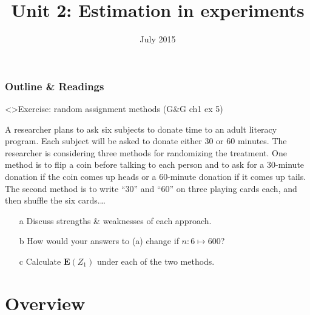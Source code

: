 %

%






\title{Unit 2: Estimation in experiments}
\date{July 2015}




  \begin{frame}
    \frametitle{Outline \& Readings}

\tableofcontents[subsectionstyle=show/hide/hide]

\end{frame}


\begin{frame}<\nottheirhandout>{Exercise: random assignment methods}
{\footnotesize (G\&G ch1 ex 5)}

A researcher plans to ask six subjects to donate time to an adult
literacy program. Each subject will be asked to donate either 30 or 60
minutes. The researcher is considering three methods for randomizing
the treatment. One method is to flip a coin before talking to each
person and to ask for a 30-minute donation if the coin comes up heads
or a 60-minute donation if it comes up tails. The second method is to
write ``30'' and ``60'' on three playing cards each, and then shuffle
the six cards.\ldots
  
\begin{itemize}
\item[a] Discuss strengths \& weaknesses of each approach.
\item[b] How would your answers to (a) change if $n: 6 \mapsto 600$?
\item[c] Calculate $\mathbf{E}(Z_{1})$ under each of the two methods.
\end{itemize}
\end{frame}


\section{Overview}



